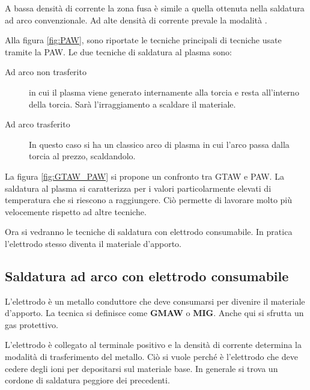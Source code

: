 \begin{figure}
\centering
{}\quad
{}
\end{figure}

A bassa densità di corrente la zona fusa è simile a quella ottenuta nella saldatura ad arco convenzionale.
Ad alte densità di corrente prevale la modalità .

Alla figura \ref{fig:PAW}, sono riportate le tecniche principali di tecniche usate tramite la \ac{PAW}.
Le due tecniche di saldatura al plasma sono:
\begin{description}
\item[Ad arco non trasferito] in cui il plasma viene generato internamente alla torcia e resta all'interno della torcia. Sarà l'irraggiamento a scaldare il materiale.
\item[Ad arco trasferito] In questo caso si ha un classico arco di plasma in cui l'arco passa dalla torcia al prezzo, scaldandolo.
\end{description}

La figura \ref{fig:GTAW_PAW} si propone un confronto tra \ac{GTAW} e \ac{PAW}.
La saldatura al plasma si caratterizza per i valori particolarmente elevati di temperatura che si riescono a raggiungere. Ciò permette di lavorare molto più velocemente rispetto ad altre tecniche.

Ora si vedranno le tecniche di saldatura con elettrodo consumabile.
In pratica l'elettrodo stesso diventa il materiale d'apporto.

\subsection{Saldatura ad arco con elettrodo consumabile}
L'elettrodo è un metallo conduttore che deve consumarsi per divenire il materiale d'apporto.
La tecnica si definisce come \textbf{GMAW} o \textbf{MIG}. 
Anche qui si sfrutta un gas protettivo.

L'elettrodo è collegato al terminale positivo e la densità di corrente determina la modalità di trasferimento del metallo.
Ciò si vuole perché è l'elettrodo che deve cedere degli ioni per depositarsi sul materiale base. In generale si trova un cordone di saldatura peggiore dei precedenti.

